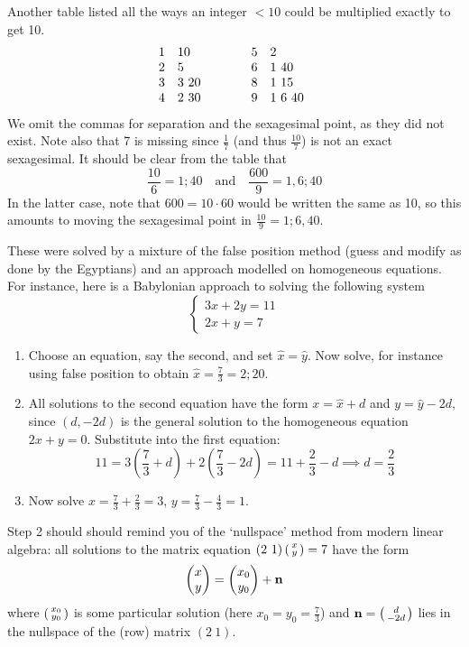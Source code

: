 Another table listed all the ways an integer $<10$ could be multiplied exactly to get 10.
\[
	\begin{array}{@{}cl@{\qquad\qquad}cl}
		1&10&5&2\\
		2&5&6&1\ 40\\
		3&3\ 20&8&1\ 15\\
		4&2\ 30&9&1\ 6\ 40
\end{array}
\]
We omit the commas for separation and the sexagesimal point, as they did not exist.  Note also that 7 is missing since $\frac 17$ (and thus $\frac{10}7$) is not an exact sexagesimal. It should be clear from the table that
\[
	\frac{10}6=1;40\quad\text{and}\quad \frac{600}9=1,6;40
\]
In the latter case, note that $600=10\cdot 60$ would be written the same as 10, so this amounts to moving the sexagesimal point in $\frac{10}9=1;6,40$.

\vfil\goodbreak



These were solved by a mixture of the false position method (guess and modify as done by the Egyptians) and an approach modelled on homogeneous equations. For instance, here is a Babylonian approach to solving the following system
\[
	\begin{cases}
		3x+2y=11\\
		2x+y=7
	\end{cases}
\]
\begin{enumerate}
  \item Choose an equation, say the second, and set $\hat x=\hat y$. Now solve, for instance using false position to obtain $\hat x=\frac 73=2;20$.
  \item All solutions to the second equation have the form $x=\hat x+d$ and $y=\hat y-2d$, since $(d,-2d)$ is the general solution to the homogeneous equation $2x+y=0$. Substitute into the first equation:
  \[
  	11=3\left(\frac 73+d\right)+2\left(\frac 73-2d\right)=11+\frac 23-d\implies d=\frac 23
  \]
  \item Now solve $x=\frac 73+\frac 23=3$, $y=\frac 73-\frac 43=1$.
\end{enumerate}\smallskip

Step 2 should should remind you of the `nullspace' method from modern linear algebra: all solutions to the matrix equation $(2\ 1)\left(\begin{smallmatrix}x\\y\end{smallmatrix}\right)=7$ have the form
\[
	\begin{pmatrix}x\\y\end{pmatrix}=\begin{pmatrix}x_0\\y_0\end{pmatrix}+{\mathbf{n}}
\]
where $\left(\begin{smallmatrix}x_0\\y_0\end{smallmatrix}\right)$ is some particular solution (here $x_0=y_0=\frac 73$) and ${\mathbf{n}}=\left(\begin{smallmatrix}d\\-2d\end{smallmatrix}\right)$ lies in the nullspace of the (row) matrix $(2\ 1)$.


